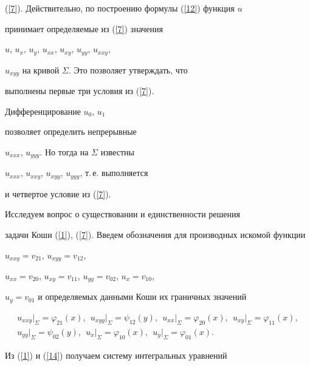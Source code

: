 (\ref{7}). Действительно, по построению формулы (\ref{12}) функция $u$


принимает определяемые  из (\ref{7}) значения


$u$, $u_{x}$, $u_{y}$, $u_{xx}$, $u_{xy}$, $u_{yy}$, $u_{xxy}$,


$u_{xyy}$ на кривой $\Sigma$. Это позволяет утверждать, что


выполнены первые три условия из (\ref{7}).


Дифференцирование $u_{0}$, $u_{1}$ 


позволяет определить непрерывные


$u_{xxx}$, $u_{yyy}$. Но тогда  на $\Sigma$ известны


$u_{xxx}$, $u_{xxy}$, $u_{xyy}$, $u_{yyy}$, т.\,е. выполняется


и четвертое условие из (\ref{7}).





Исследуем вопрос о существовании и единственности решения


задачи Коши (\ref{1}), (\ref{7}). Введем обозначения для производных искомой функции


$u_{xxy}=v_{21}$, $u_{xyy}=v_{12}$,


$u_{xx}=v_{20}$, $u_{xy}=v_{11}$, $u_{yy}=v_{02}$, $u_{x}=v_{10}$,


$u_{y}=v_{01}$ и определяемых данными Коши их граничных значений


\begin{equation}\label{14}


\begin{array}{c}


u_{xxy}\vert_{\Sigma}=\varphi_{21}(x),\ \


u_{xyy}\vert_{\Sigma}=\psi_{12}(y),\ \


u_{xx}\vert_{\Sigma}=\varphi_{20}(x),\ \


u_{xy}\vert_{\Sigma}=\varphi_{11}(x),\\[2mm]


u_{yy}\vert_{\Sigma}=\psi_{02}(y),\ \


u_{x}\vert_{\Sigma}=\varphi_{10}(x),\ \


u_{y}\vert_{\Sigma}=\varphi_{01}(x).


\end{array}


\end{equation}


Из (\ref{1}) и (\ref{14}) получаем систему интегральных уравнений


